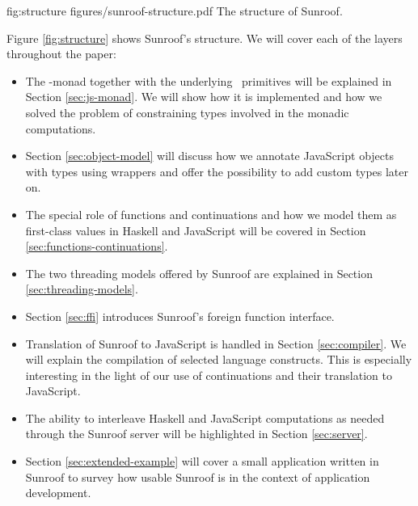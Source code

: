 \Figure%
{fig:structure}%
{figures/sunroof-structure.pdf}%
{The structure of Sunroof.}

Figure \ref{fig:structure} shows Sunroof's structure.
We will cover each of the layers throughout the paper:
\begin{itemize}
\item
The \JS-monad together with the underlying \JSI~primitives 
will be explained in Section \ref{sec:js-monad}. 
We will show how it is implemented and how we solved
the problem of constraining types involved in the monadic 
computations.
\item
Section \ref{sec:object-model} will discuss how we annotate 
JavaScript objects with types using wrappers 
and offer the possibility to add custom types later on.
\item
The special role of functions and continuations and
how we model them as first-class values in Haskell and JavaScript
will be covered in Section \ref{sec:functions-continuations}.
\item
The two threading models offered by Sunroof are explained 
in Section \ref{sec:threading-models}.
\item
Section \ref{sec:ffi} introduces Sunroof's foreign function interface.
\item
Translation of Sunroof to JavaScript is handled in 
Section \ref{sec:compiler}. We will explain the 
compilation of selected language constructs. This is 
especially interesting in the light of our use of continuations
and their translation to JavaScript.
\item
The ability to interleave Haskell and JavaScript computations as needed
through the Sunroof server will be highlighted in Section \ref{sec:server}.
\item
Section \ref{sec:extended-example} will cover a small application 
written in Sunroof to survey how usable Sunroof is in the 
context of application development. 
\end{itemize}

